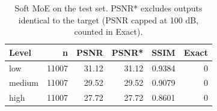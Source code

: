 \begin{table}[t]
\centering
\caption{Soft MoE on the test set. PSNR* excludes outputs identical to the target (PSNR capped at 100 dB, counted in Exact).}
\label{tab:task3_by_level}
\begin{tabular}{lrrrrr}
\toprule
Level & n & PSNR & PSNR* & SSIM & Exact \\
\midrule
low & 11007 & 31.12 & 31.12 & 0.9384 & 0 \\
medium & 11007 & 29.52 & 29.52 & 0.9079 & 0 \\
high & 11007 & 27.72 & 27.72 & 0.8601 & 0 \\
\bottomrule
\end{tabular}
\end{table}
